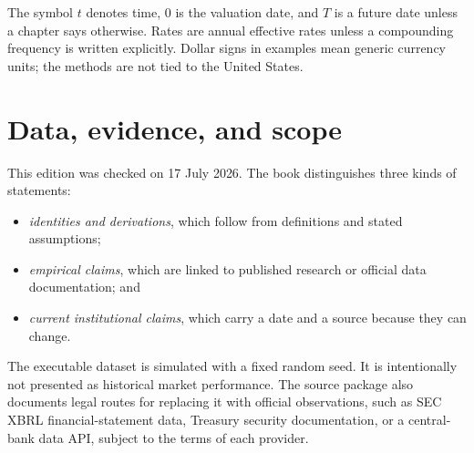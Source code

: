 \documentclass[11pt,oneside,openany]{book}
\begin{document}
The symbol $t$ denotes time, $0$ is the valuation date, and $T$ is a future date unless a chapter says otherwise. Rates are annual effective rates unless a compounding frequency is written explicitly. Dollar signs in examples mean generic currency units; the methods are not tied to the United States.

\chapter*{Data, evidence, and scope}
This edition was checked on 17 July 2026. The book distinguishes three kinds of statements:

\begin{itemize}
  \item \textit{identities and derivations}, which follow from definitions and stated assumptions;
  \item \textit{empirical claims}, which are linked to published research or official data documentation; and
  \item \textit{current institutional claims}, which carry a date and a source because they can change.
\end{itemize}

The executable dataset is simulated with a fixed random seed. It is intentionally not presented as historical market performance. The source package also documents legal routes for replacing it with official observations, such as SEC XBRL financial-statement data, Treasury security documentation, or a central-bank data API, subject to the terms of each provider.

\tableofcontents
\listoffigures

\mainmatter




















\appendix






\end{document}
